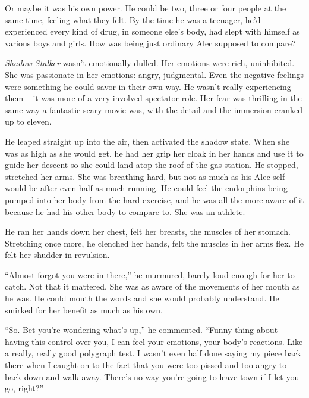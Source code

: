 Or maybe it was his own power.  He could be two, three or four people at the same time, feeling what they felt.  By the time he was a teenager, he'd experienced every kind of drug, in someone else's body, had slept with himself as various boys and girls.  How was being just ordinary Alec supposed to compare?



\emph{Shadow Stalker} wasn't emotionally dulled.  Her emotions were rich, uninhibited.  She was  passionate in her emotions: angry, judgmental.  Even the negative feelings were something he could savor in their own way.  He wasn't really experiencing them – it was more of a very involved spectator role.  Her fear was thrilling in the same way a fantastic scary movie was, with the detail and the immersion cranked up to eleven.



He leaped straight up into the air, then activated the shadow state.  When she was as high as she would get, he had her grip her cloak in her hands and use it to guide her descent so she could land atop the roof of the gas station.  He stopped, stretched her arms.  She was breathing hard, but not as much as his Alec-self would be after even half as much running.  He could feel the endorphins being pumped into her body from the hard exercise, and he was all the more aware of it because he had his other body to compare to.  She was an athlete.



He ran her hands down her chest, felt her breasts, the muscles of her stomach.  Stretching once more, he clenched her hands, felt the muscles in her arms flex.  He felt her shudder in revulsion.



``Almost forgot you were in there,'' he murmured, barely loud enough for her to catch.  Not that it mattered.  She was as aware of the movements of her mouth as he was.  He could mouth the words and she would probably understand.  He smirked for her benefit as much as his own.



``So.  Bet you're wondering what's up,'' he commented.  ``Funny thing about having this control over you, I can feel your emotions, your body's reactions.  Like a really, really good polygraph test.  I wasn't even half done saying my piece back there when I caught on to the fact that you were too pissed and too angry to back down and walk away.  There's no way you're going to leave town if I let you go, right?''



